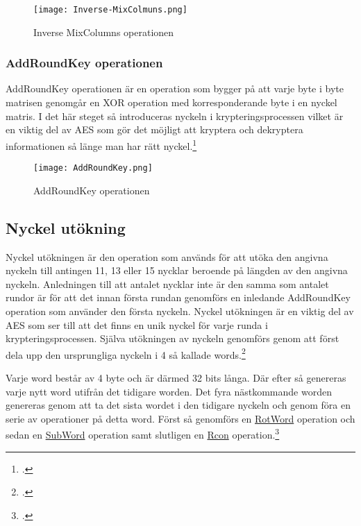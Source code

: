 \begin{figure}[H]
    \centering
    \texttt{[image: Inverse-MixColmuns.png]}
    \caption{Inverse MixColumns operationen}
    \label{fig:aes-inverse-mixcolumns-pic}
\end{figure}

\subsubsection{AddRoundKey operationen}
\label{sec:aes-addroundkey}

AddRoundKey operationen är en operation som bygger på att varje \gls{byte} i \gls{byte} matrisen genomgår en XOR operation med korresponderande \gls{byte} i en nyckel matris.
I det här steget så introduceras nyckeln i krypteringsprocessen vilket är en viktig del av AES som gör det möjligt att kryptera och dekryptera informationen så länge man har rätt nyckel.\footcite{daemen1999aes}

\begin{figure}[H]
    \centering
    \texttt{[image: AddRoundKey.png]}
    \caption{AddRoundKey operationen}
    \label{fig:aes-addroundkey-pic}
\end{figure}

\pagebreak
\subsection{Nyckel utökning}
\label{sec:aes-key-expansion}

Nyckel utökningen är den operation som används för att utöka den angivna nyckeln till antingen 11, 13 eller 15 nycklar beroende på längden av den angivna nyckeln.
Anledningen till att antalet nycklar inte är den samma som antalet rundor är för att det innan första rundan genomförs en inledande AddRoundKey operation som använder den första nyckeln.
Nyckel utökningen är en viktig del av AES som ser till att det finns en unik nyckel för varje runda i krypteringsprocessen.
Själva utökningen av nyckeln genomförs genom att först dela upp den ursprungliga nyckeln i 4 så kallade words.\footcite{daemen1999aes}

Varje word består av 4 \gls{byte} och är därmed 32 \gls{bit}s långa.
Där efter så genereras varje nytt word utifrån det tidigare worden. Det fyra nästkommande worden genereras genom att ta det sista wordet i den tidigare nyckeln och genom föra en serie av operationer
på detta word. Först så genomförs en \hyperref[sec:aes-rotword]{RotWord} operation och sedan en \hyperref[sec:aes-subword]{SubWord} operation samt slutligen en \hyperref[sec:aes-rcon]{Rcon} operation.\footcite{daemen1999aes}

